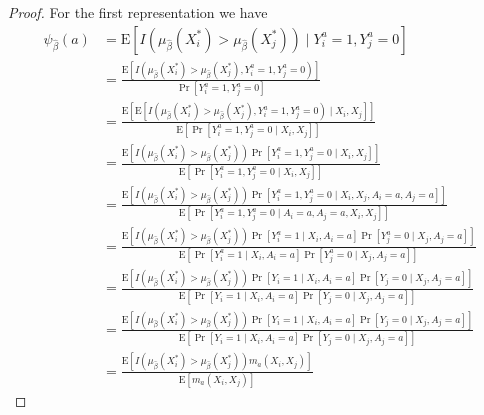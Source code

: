\begin{proof}
    For the first representation we have 
$$
\begin{aligned}
 \psi_{\widehat{\beta}}(a)&= \mathrm{E}\left[I\left(\mu_{\widehat{\beta}}(X_i^*)>\mu_{\widehat{\beta}}(X_j^*)\right) \mid Y^a_i=1, Y^a_j=0\right] \\
&= \frac{\mathrm{E}\left[I\left(\mu_{\widehat{\beta}}(X_i^*)>\mu_{\widehat{\beta}}(X_j^*), Y^a_i=1, Y^a_j=0\right)\right]}{\operatorname{Pr}\left[Y^a_i=1, Y^a_j=0\right]} \\
&= \frac{\mathrm{E}\left[\mathrm{E}\left[I\left(\mu_{\widehat{\beta}}(X_i^*)>\mu_{\widehat{\beta}}(X_j^*), Y^a_i=1, Y^a_j=0\right) \mid X_i, X_j\right]\right]}{\mathrm{E}\left[\operatorname{Pr}\left[Y^a_i=1, Y^a_j=0 \mid X_i, X_j\right]\right]} \\
&= \frac{\mathrm{E}\left[I\left(\mu_{\widehat{\beta}}(X_i^*)>\mu_{\widehat{\beta}}(X_j^*)\right) \operatorname{Pr}\left[Y^a_i=1, Y^a_j=0  \mid X_i, X_j\right]\right]}{\mathrm{E}\left[\operatorname{Pr}\left[Y^a_i=1, Y^a_j=0  \mid X_i, X_j\right]\right]} \\
&= \frac{\mathrm{E}\left[I\left(\mu_{\widehat{\beta}}(X_i^*)>\mu_{\widehat{\beta}}(X_j^*)\right) \operatorname{Pr}\left[Y^a_i=1, Y^a_j=0  \mid X_i, X_j, A_i = a, A_j = a\right]\right]}{\mathrm{E}\left[\operatorname{Pr}\left[Y^a_i=1, Y^a_j=0  \mid A_i = a, A_j = a, X_i, X_j\right]\right]} \\
&= \frac{\mathrm{E}\left[I\left(\mu_{\widehat{\beta}}(X_i^*)>\mu_{\widehat{\beta}}(X_j^*)\right) \operatorname{Pr}\left[Y^a_i=1 \mid X_i,A_i = a\right] \Pr\left[ Y^a_j=0 \mid X_j, A_j = a\right]\right]}{\mathrm{E}\left[\operatorname{Pr}\left[Y^a_i=1 \mid X_i,A_i = a\right] \Pr\left[ Y^a_j=0 \mid X_j, A_j = a\right]\right]} \\
&= \frac{\mathrm{E}\left[I\left(\mu_{\widehat{\beta}}(X_i^*)>\mu_{\widehat{\beta}}(X_j^*)\right) \operatorname{Pr}\left[Y_i=1 \mid X_i,A_i = a\right] \Pr\left[ Y_j=0 \mid X_j, A_j = a\right]\right]}{\mathrm{E}\left[\operatorname{Pr}\left[Y_i=1 \mid X_i,A_i = a\right] \Pr\left[ Y_j=0 \mid X_j, A_j = a\right]\right]} \\
&= \frac{\mathrm{E}\left[I\left(\mu_{\widehat{\beta}}(X_i^*)>\mu_{\widehat{\beta}}(X_j^*)\right) \operatorname{Pr}\left[Y_i=1 \mid X_i,A_i = a\right] \Pr\left[ Y_j=0 \mid X_j, A_j = a\right]\right]}{\mathrm{E}\left[\operatorname{Pr}\left[Y_i=1 \mid X_i,A_i = a\right] \Pr\left[ Y_j=0 \mid X_j, A_j = a\right]\right]} \\
&= \frac{\mathrm{E}\left[I\left(\mu_{\widehat{\beta}}(X_i^*)>\mu_{\widehat{\beta}}(X_j^*)\right)m_a(X_i, X_j) \right]}{\mathrm{E}\left[m_a(X_i, X_j) \right]}
\end{aligned}
$$


\end{proof}
